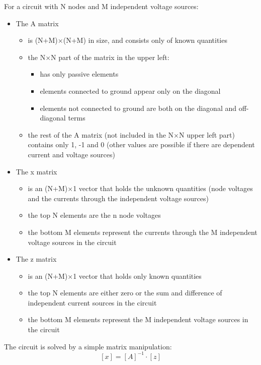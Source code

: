\documentclass[10pt]{report}
\begin{document}
For a circuit with N nodes and M independent voltage sources:

\begin{itemize}

\item The A matrix
\begin{itemize}
\item
is (N+M)$\times$(N+M) in size, and consists only of known quantities
\item
the N$\times$N part of the matrix in the upper left:
\begin{itemize}
\item
has only passive elements
\item
elements connected to ground appear only on the diagonal
\item
elements not connected to ground are both on the diagonal and
off-diagonal terms
\end{itemize}
\item
the rest of the A matrix (not included in the N$\times$N upper left
part) contains only 1, -1 and 0 (other values are possible if there
are dependent current and voltage sources)
\end{itemize}

\item The x matrix
\begin{itemize}
\item
is an (N+M)$\times$1 vector that holds the unknown quantities (node
voltages and the currents through the independent voltage sources)
\item
the top N elements are the n node voltages
\item
the bottom M elements represent the currents through the M independent
voltage sources in the circuit
\end{itemize}

\item The z matrix
\begin{itemize}
\item
is an (N+M)$\times$1 vector that holds only known quantities
\item
the top N elements are either zero or the sum and difference of
independent current sources in the circuit
\item
the bottom M elements represent the M independent voltage sources in
the circuit
\end{itemize}
\end{itemize}

The circuit is solved by a simple matrix manipulation:
\begin{equation}
\left[x\right] = \left[A\right]^{-1} \cdot \left[z\right]
\end{equation}
\end{document}
